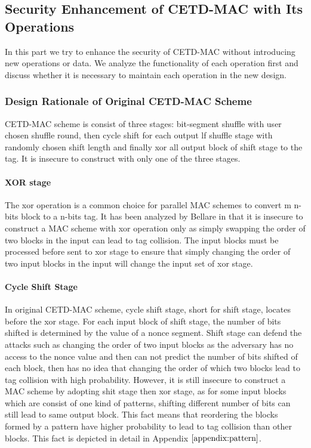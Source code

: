 \subsection{Security Enhancement of CETD-MAC with Its Operations}\label{sect:pattern}
In this part we try to enhance the security of CETD-MAC without introducing new operations or data. We analyze the functionality of each operation first and discuss whether it is necessary to maintain each operation in the new design.
\subsubsection{Design Rationale of Original CETD-MAC Scheme}
CETD-MAC scheme is consist of three stages: bit-segment shuffle with user chosen shuffle round, then cycle shift for each output lf shuffle stage with randomly chosen shift length and finally xor all output block of shift stage to the tag. It is insecure to construct with only one of the three stages.
\paragraph{XOR stage}
The xor operation is a common choice for parallel MAC schemes to convert m n-bits block to a n-bits tag. It has been analyzed by Bellare in \cite{} that it is insecure to construct a MAC scheme with xor operation only as simply swapping the order of two blocks in the input can lead to tag collision.  The input blocks must be processed before sent to xor stage to ensure that simply changing the order of two input blocks in the input will change the input set of xor stage.
\paragraph{Cycle Shift Stage}
In original CETD-MAC scheme, cycle shift stage, short for shift stage, locates before the xor stage. For each input block of shift stage, the number of bits shifted is determined by the value of a nonce segment. Shift stage can defend the attacks such as changing the order of two input blocks as the adversary has no access to the nonce value and then can not predict the number of bits shifted of each block, then has no idea that changing the order of which two blocks lead to tag collision with high probability. However, it is still insecure to construct a MAC scheme by adopting shit stage then xor stage, as for some input blocks which are consist of one kind of patterns, shifting different number of bits can still lead to same output block. This fact means that reordering the blocks formed by a pattern have higher probability to lead to tag collision than other blocks. This fact is depicted in detail in Appendix $\ref{appendix:pattern}$. 

